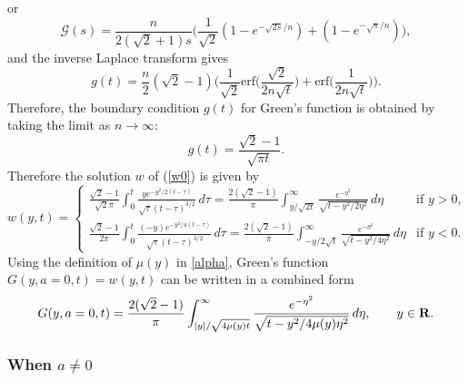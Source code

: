 \documentclass[11pt]{amsart}
\def\R{{\bf R}}
\def\R{{\bf R}}
\def\erf{\mathrm{erf}}
\begin{document}
or
\[ \mathcal{G} (s) = \frac{n}{2(\sqrt{2}+1) s} \Big( \frac{1}{\sqrt{2}} (1 - e^{-\sqrt{2s}/n}) + (1 - e^{-\sqrt{s}/n}) \Big),\]
and the inverse Laplace transform gives
\[ g(t) = \frac{n}{2} (\sqrt{2} - 1) \Big( \frac{1}{\sqrt{2}} \erf\big( \frac{\sqrt{2}}{2n\sqrt{t}} \big) + \erf \big( \frac{1}{2n \sqrt{t}} \big) \Big). \]
Therefore, the boundary condition $g(t)$ for Green's function is obtained by taking the limit as $n \to \infty$:
\[ g(t) = \frac{\sqrt{2} - 1}{\sqrt{\pi t}}. \]
Therefore the solution $w$ of (\ref{w0}) is given by
\[w(y,t)=\begin{cases}
\frac{\sqrt{2}-1}{\sqrt{2} \pi} \int_0^t \frac{y e^{-y^2/2(t-\tau)}}{\sqrt{\tau} (t-\tau)^{3/2}} \,d\tau = \frac{2 (\sqrt{2}-1)}{\pi} \int_{y/\sqrt{2t}}^\infty \frac{e^{-\eta^2}}{\sqrt{t - y^2/2\eta^2}} \,d\eta & \text{if $y > 0$,} \\
\frac{\sqrt{2}-1}{2\pi} \int_0^t \frac{(-y) e^{-y^2/4(t-\tau)}}{\sqrt{\tau} (t-\tau)^{3/2}} \,d\tau = \frac{2 (\sqrt{2}-1)}{\pi} \int_{-y/2\sqrt{t}}^\infty \frac{e^{-\eta^2}}{\sqrt{t-y^2/4\eta^2}}\,d\eta & \text{if $y < 0$.}
\end{cases}\]
Using the definition of $\mu(y)$ in \eqref{alpha}, Green's function $G(y,a=0,t)=w(y,t)$ can be written in a combined form
\begin{equation}\label{G0}
G(y,a=0,t)=\frac{2(\sqrt{2}-1)}{\pi} \int_{|y|/\sqrt{4\mu(y)t}}^\infty \frac{e^{-\eta^2}}{\sqrt{t-y^2/4\mu(y)\eta^2}}\,d\eta,\qquad y\in\R.
\end{equation}



\subsubsection{When $a\ne0$}
\end{document}
